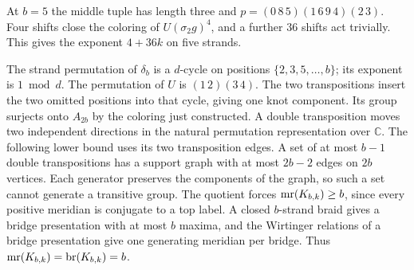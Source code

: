 \begin{example}
At \(b=5\) the middle tuple has length three and
\(p=(0\,8\,5)(1\,6\,9\,4)(2\,3)\). Four shifts close the
coloring of \(U(\sigma_2g)^4\), and a further \(36\) shifts act
trivially. This gives the exponent \(4+36k\) on five strands.
\end{example}

The strand permutation of \(\delta_b\) is a \(d\)-cycle on positions
\(\{2,3,5,\ldots,b\}\); its exponent is \(1\bmod d\).
The permutation of \(U\) is \((1\,2)(3\,4)\). The two transpositions
insert the two omitted positions into that cycle, giving one knot
component. Its group surjects onto \(A_{2b}\) by the coloring just
constructed. A double transposition moves two independent directions in the natural
permutation representation over \(\mathbb C\). The following lower
bound uses its two transposition edges. A set of at most \(b-1\) double transpositions has a
support graph with at most \(2b-2\) edges on \(2b\) vertices. Each
generator preserves the components of the graph, so such a set
cannot generate a transitive group. The quotient forces
\(\operatorname{mr}(K_{b,k})\ge b\), since every positive meridian is conjugate to
a top label. A closed \(b\)-strand braid gives a bridge presentation
with at most \(b\) maxima, and the Wirtinger relations of a bridge
presentation give one generating meridian per bridge. Thus
\(\operatorname{mr}(K_{b,k})=\operatorname{br}(K_{b,k})=b\).
